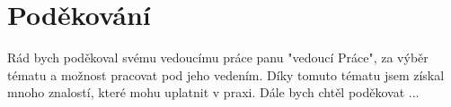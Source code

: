 \vspace*{\fill}
\section*{Poděkování}
Rád bych poděkoval svému vedoucímu práce panu "vedoucí Práce", za výběr tématu a možnost pracovat pod jeho vedením. Díky tomuto tématu jsem získal mnoho znalostí, které mohu uplatnit v praxi. Dále bych chtěl poděkovat ...
